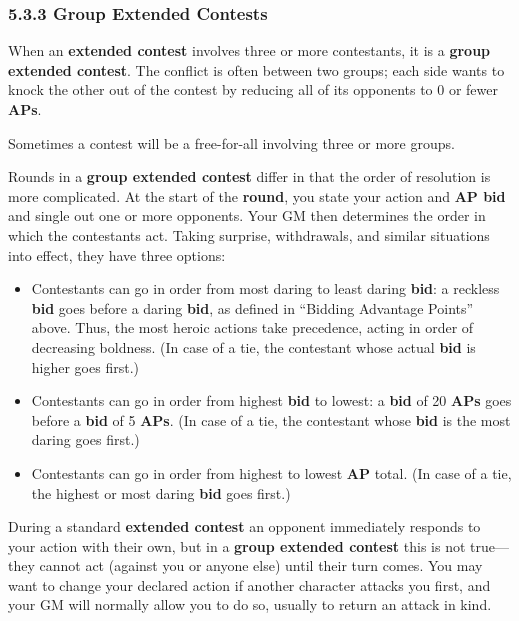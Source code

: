 \documentclass[
]{article}
\begin{document}
\hypertarget{group-extended-contests}{%
\subsubsection{5.3.3 Group Extended
Contests}\label{group-extended-contests}}

When an \textbf{extended contest} involves three or more contestants, it
is a \textbf{group extended contest}. The conflict is often between two
groups; each side wants to knock the other out of the contest by
reducing all of its opponents to 0 or fewer \textbf{APs}.

Sometimes a contest will be a free-for-all involving three or more
groups.

Rounds in a \textbf{group extended contest} differ in that the order of
resolution is more complicated. At the start of the \textbf{round}, you
state your action and \textbf{AP bid} and single out one or more
opponents. Your GM then determines the order in which the contestants
act. Taking surprise, withdrawals, and similar situations into effect,
they have three options:

\begin{itemize}
\item
  Contestants can go in order from most daring to least daring
  \textbf{bid}: a reckless \textbf{bid} goes before a daring
  \textbf{bid}, as defined in ``Bidding Advantage Points'' above. Thus,
  the most heroic actions take precedence, acting in order of decreasing
  boldness. (In case of a tie, the contestant whose actual \textbf{bid}
  is higher goes first.)
\item
  Contestants can go in order from highest \textbf{bid} to lowest: a
  \textbf{bid} of 20 \textbf{APs} goes before a \textbf{bid} of 5
  \textbf{APs}. (In case of a tie, the contestant whose \textbf{bid} is
  the most daring goes first.)
\item
  Contestants can go in order from highest to lowest \textbf{AP} total.
  (In case of a tie, the highest or most daring \textbf{bid} goes
  first.)
\end{itemize}

During a standard \textbf{extended contest} an opponent immediately
responds to your action with their own, but in a \textbf{group extended
contest} this is not true---they cannot act (against you or anyone else)
until their turn comes. You may want to change your declared action if
another character attacks you first, and your GM will normally allow you
to do so, usually to return an attack in kind.
\end{document}
